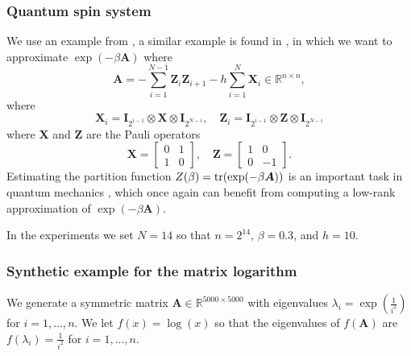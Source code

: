 \subsubsection{Quantum spin system}\label{section:quantum_spin}
We use an example from \cite[Section 4.3]{epperly2023xtrace}, a similar example is found in \cite{chen_hallman_23}, in which we want to approximate $\exp(-\beta \bm{A})$ where 
\begin{equation*}
    \bm{A} = -\sum\limits_{i=1}^{N-1} \bm{Z}_i\bm{Z}_{i+1} -h\sum\limits_{i=1}^N \bm{X}_i \in \mathbb{R}^{n \times n},
\end{equation*}
where
\begin{equation*}
    \bm{X}_i = \bm{I}_{2^{i-1}} \otimes \bm{X} \otimes \bm{I}_{2^{N-i}}, \quad \bm{Z}_i = \bm{I}_{2^{i-1}} \otimes \bm{Z} \otimes \bm{I}_{2^{N-i}}
\end{equation*}
where $\bm{X}$ and $\bm{Z}$ are the Pauli operators
\begin{equation*}
    \bm{X} = \begin{bmatrix} 0 & 1 \\ 1 & 0 \end{bmatrix}, \quad \bm{Z} = \begin{bmatrix} 1 & 0 \\ 0 & -1 \end{bmatrix}.
\end{equation*}
Estimating the partition function $Z(\beta) = \operatorname{tr}(\exp(-\beta \bm{A}))$ is an important task in quantum mechanics \cite{pfeuty1970one}, which once again can benefit from computing a low-rank approximation of $\exp(-\beta \bm{A})$.

In the experiments we set $N = 14$ so that $n = 2^{14}$, $\beta = 0.3$, and $h = 10$.  



\subsubsection{Synthetic example for the matrix logarithm}\label{section:synthetic_log}
We generate a symmetric matrix $\bm{A} \in \mathbb{R}^{5000 \times 5000}$ with eigenvalues $\lambda_i = \exp(\frac{1}{i^2})$ for $i = 1,\ldots,n$. We let $f(x) = \log(x)$ so that the eigenvalues of $f(\bm{A})$ are $f(\lambda_i) = \frac{1}{i^2}$ for $i = 1,\ldots,n$.


